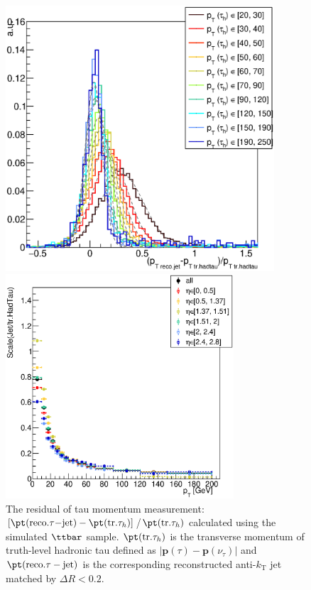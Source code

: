 \clearpage
\begin{figure}[htbp]
  \begin{center}
      \includegraphics[width=100mm]{figures/BGestimation/ObjReplacement/method/tauRF/ptResidual.eps} 
      \caption{The residual of tau momentum measurement: $[\pt(\mathrm{reco. } \tau\mathrm{-jet})-\pt(\mathrm{tr. } \tau_{h})]$/$\pt(\mathrm{tr.} \tau_{h})$ calculated using the simulated $\ttbar$ sample. $\pt(\mathrm{tr.} \tau_{h})$ is the transverse momentum of truth-level hadronic tau defined as $|\bm{p}(\tau)-\bm{p}(\nu_{\tau})|$ and $\pt(\mathrm{reco.} \tau-\mathrm{jet})$ is the corresponding reconstructed anti-$k_{\mathrm{T}}$ jet matched by $\Delta R<0.2$. }
      \label{fig::BGestimation::objRep::tau_ptResidual}
    \begin{minipage}[t]{.45\textwidth}
      \centering        
      \includegraphics[width=85mm]{figures/BGestimation/ObjReplacement/method/tauRF/tauJet_scale.eps} 

\end{minipage}
\end{center}
\end{figure}
